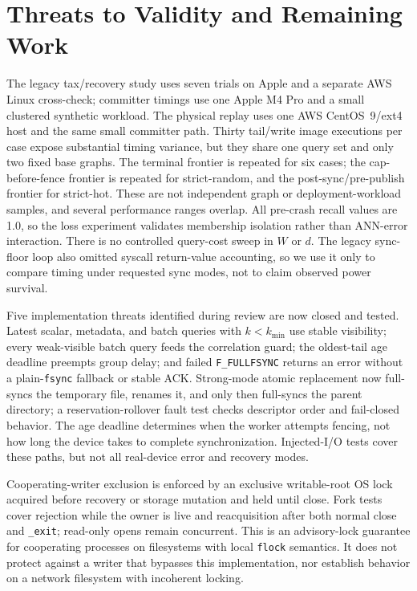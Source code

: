 \documentclass[sigconf,nonacm,balance=false]{acmart}
\newcommand{\fullfsync}{\texttt{F\_FULLFSYNC}}
\newcommand{\fsync}{\texttt{fsync}}
\begin{document}
\section{Threats to Validity and Remaining Work}
\label{sec:threats}
The legacy tax/recovery study uses seven trials on Apple and a separate AWS Linux
cross-check; committer timings use one Apple M4 Pro and a small clustered
synthetic workload. The physical replay uses one AWS CentOS~9/ext4 host and the
same small committer path. Thirty tail/write image executions per case expose substantial
timing variance, but they share one query set and only two fixed base graphs. The
terminal frontier is repeated for six cases; the cap-before-fence frontier is
repeated for strict-random, and the post-sync/pre-publish frontier for strict-hot.
These are not independent graph or deployment-workload
samples, and several performance ranges overlap. All pre-crash recall values are 1.0, so
the loss experiment validates membership isolation rather than ANN-error
interaction. There is no controlled query-cost sweep in $W$ or $d$. The legacy
sync-floor loop also omitted syscall return-value accounting, so we use it only to
compare timing under requested sync modes, not to claim observed power survival.

Five implementation threats identified during review are now closed and tested.
Latest scalar, metadata, and batch queries with $k<k_{\min}$ use stable visibility;
every weak-visible batch query feeds the correlation guard; the oldest-tail age
deadline preempts group delay; and failed \fullfsync{} returns an error without a
plain-\fsync{} fallback or stable ACK. Strong-mode atomic replacement now
full-syncs the temporary file, renames it, and only then full-syncs the parent
directory; a reservation-rollover fault test checks descriptor order and
fail-closed behavior. The age deadline determines when the worker attempts
fencing, not how long the device takes to complete synchronization. Injected-I/O tests cover these
paths, but not all real-device error and recovery modes.

Cooperating-writer exclusion is enforced by an exclusive writable-root OS lock
acquired before recovery or storage mutation and held until close. Fork tests
cover rejection while the owner is live and reacquisition after both normal
close and \texttt{\_exit}; read-only opens remain concurrent. This is an
advisory-lock guarantee for cooperating processes on filesystems with local
\texttt{flock} semantics. It does not protect against a writer that bypasses
this implementation, nor establish behavior on a network filesystem with
incoherent locking.
\end{document}
